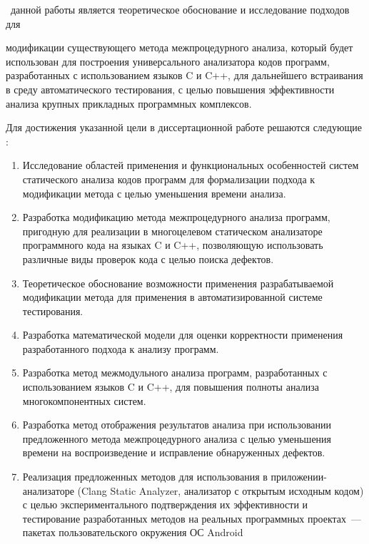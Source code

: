 \aim\ данной работы является теоретическое обоснование и исследование подходов для {модификации существующего метода межпроцедурного анализа, который будет использован для построения универсального анализатора кодов программ, разработанных с использованием языков C и C++, для дальнейшего встраивания в среду автоматического тестирования, с целью повышения эффективности анализа крупных прикладных программных комплексов. %

Для достижения указанной цели в диссертационной работе решаются следующие {\tasks}:
\begin{enumerate}
  \item Исследование областей применения и функциональных особенностей систем статического анализа кодов программ для формализации подхода к модификации метода с целью уменьшения времени анализа.
  \item Разработка модификацию метода межпроцедурного анализа программ, пригодную для реализации в многоцелевом статическом анализаторе программного кода на языках C и C++, позволяющую использовать различные виды проверок кода с целью поиска дефектов.
  \item Теоретическое обоснование возможности применения разрабатываемой модификации метода для применения в автоматизированной системе тестирования.
  \item Разработка математической модели для оценки корректности применения разработанного подхода к анализу программ.
  \item Разработка метод межмодульного анализа программ, разработанных с использованием языков C и C++, для повышения полноты анализа многокомпонентных систем.
  \item Разработка метод отображения результатов анализа при использовании предложенного метода межпроцедурного анализа с целью уменьшения времени на воспроизведение и исправление обнаруженных дефектов.
  \item Реализация предложенных методов для использования в приложении-анализаторе (Clang Static Analyzer, анализатор с открытым исходным кодом) с целью экспериментального подтверждения их эффективности и тестирование разработанных методов на реальных программных проектах~--- пакетах пользовательского окружения ОС Android
\end{enumerate}

}
